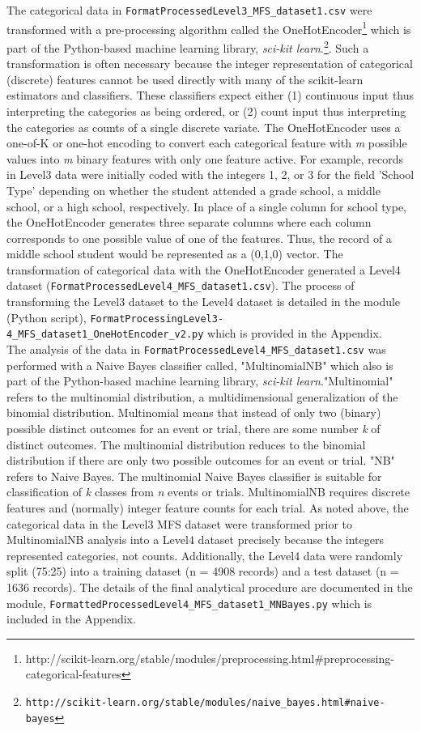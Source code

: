 \documentclass[twoside]{article}	%
\begin{document}
\noindent The categorical data in \verb!FormatProcessedLevel3_MFS_dataset1.csv! were transformed with a pre-processing algorithm called the OneHotEncoder\footnote{http://scikit-learn.org/stable/modules/preprocessing.html\#preprocessing-categorical-features} which is part of the Python-based machine learning library, \textit{sci-kit learn}.\footnote{\verb|http://scikit-learn.org/stable/modules/naive_bayes.html#naive-bayes|}. Such a transformation is often necessary because the integer representation of categorical (discrete) features cannot be used directly with many of the scikit-learn estimators and classifiers. These classifiers expect either (1) continuous input thus interpreting the categories as being ordered, or (2) count input thus interpreting the categories as counts of a single discrete variate. The OneHotEncoder uses a one-of-K or one-hot encoding to convert each categorical feature with \textit{m} possible values into \textit{m} binary features with only one feature active. For example, records in Level3 data were initially coded with the integers 1, 2, or 3 for the field 'School Type' depending on whether the student attended a grade school, a middle school, or a high school, respectively. In place of a single column for school type, the OneHotEncoder generates three separate columns where each column corresponds to one possible value of one of the features. Thus, the record of a middle school student would be represented as a (0,1,0) vector. The transformation of categorical data with the OneHotEncoder generated a Level4 dataset (\verb!FormatProcessedLevel4_MFS_dataset1.csv!). The process of transforming the Level3 dataset to the Level4 dataset is detailed in the module (Python script), \verb!FormatProcessingLevel3-4_MFS_dataset1_OneHotEncoder_v2.py! which is provided in the Appendix.\\

\noindent The analysis of the data in \verb!FormatProcessedLevel4_MFS_dataset1.csv! was performed with a Naive Bayes classifier called, "MultinomialNB" which also is part of the Python-based machine learning library, \textit{sci-kit learn}."Multinomial" refers to the multinomial distribution, a multidimensional generalization of the binomial distribution. Multinomial means that instead of only two (binary) possible distinct outcomes for an event or trial, there are some number \textit{k} of distinct outcomes. The multinomial distribution reduces to the binomial distribution if there are only two possible outcomes for an event or trial. "NB" refers to Naive Bayes. The multinomial Naive Bayes classifier is suitable for classification of \textit{k} classes from \textit{n} events or trials. MultinomialNB requires discrete features and (normally) integer feature counts for each trial. As noted above, the categorical data in the Level3 MFS dataset were transformed prior to MultinomialNB analysis into a Level4 dataset precisely because the integers represented categories, not counts. Additionally, the Level4 data were randomly split (75:25) into a training dataset (n = 4908 records) and a test dataset (n = 1636 records). The details of the final analytical procedure are documented in the module, \verb!FormattedProcessedLevel4_MFS_dataset1_MNBayes.py! which is included in the Appendix.\\
\end{document}
